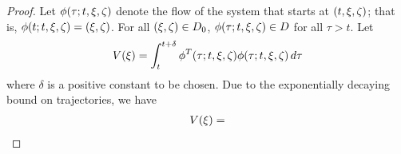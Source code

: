 \begin{proof}
  Let $\phi(\tau; t, \xi, \zeta)$ denote the flow of the system that starts at
  $(t, \xi, \zeta)$; that is, $\phi(t; t, \xi, \zeta) = (\xi, \zeta)$. For all $(\xi, \zeta) \in
  D_{0}$, $\phi(\tau; t, \xi, \zeta) \in D$ for all $\tau > t$. Let
  \begin{align*}
    V(\xi) = \int_{t}^{t + \delta} \phi^{T}(\tau; t, \xi, \zeta) \phi(\tau; t,
    \xi, \zeta) \, d\tau
  \end{align*}
  where $\delta$ is a positive constant to be chosen. Due to the exponentially
  decaying bound on trajectories, we have
  \begin{align*}
    V(\xi) = 
  \end{align*}
\end{proof}

